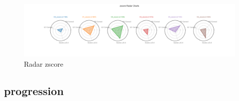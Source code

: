\documentclass{article}
\begin{document}
\begin{figure}[H]
    \centering
    \includegraphics[width=1\columnwidth]{Crystal/feedback_logtransform_zNonepca2k6/radar_zscore.png}
    \caption{Radar zscore}
    \label{fig:Crystalfeedbackradarzscore}
\end{figure}
\subsection{progression}
\end{document}

